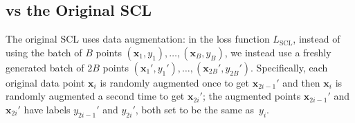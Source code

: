 \subsection{ vs the Original SCL}
\label{ch02:sec:relating-to-original-SCL}
The original SCL uses data augmentation: in the loss function $L_{\text{SCL}}$, instead of using the batch of $B$ points $(\mathbf{x}_1,y_1),\dots,(\mathbf{x}_B,y_B)$, we instead use a freshly generated batch of $2B$ points $(\mathbf{x}_1',y_1'),\dots,(\mathbf{x}_{2B}',y_{2B}')$.
Specifically, each original data point $\mathbf{x}_i$ is randomly augmented once to get $\mathbf{x}_{2i-1}'$ and then $\mathbf{x}_i$ is randomly augmented a second time to get $\mathbf{x}_{2i}'$; the augmented points $\mathbf{x}_{2i-1}'$ and $\mathbf{x}_{2i}'$ have labels $y_{2i-1}'$ and $y_{2i}'$, both set to be the same as~$y_i$.

